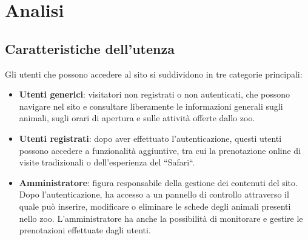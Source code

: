 \section{Analisi}

\subsection{Caratteristiche dell'utenza}
Gli utenti che possono accedere al sito si suddividono in tre categorie principali:
\begin{itemize}
    \item \textbf{Utenti generici}: visitatori non registrati o non autenticati, che possono navigare nel sito e consultare liberamente le informazioni generali sugli animali, sugli orari di apertura e sulle attività offerte dallo zoo.
    
    \item \textbf{Utenti registrati}: dopo aver effettuato l'autenticazione, questi utenti possono accedere a funzionalità aggiuntive, tra cui la prenotazione online di visite tradizionali o dell’esperienza del ``Safari``.
    
    \item \textbf{Amministratore}: figura responsabile della gestione dei contenuti del sito. Dopo l’autenticazione, ha accesso a un pannello di controllo attraverso il quale può inserire, modificare o eliminare le schede degli animali presenti nello zoo. L’amministratore ha anche la possibilità di monitorare e gestire le prenotazioni effettuate dagli utenti.
\end{itemize}

